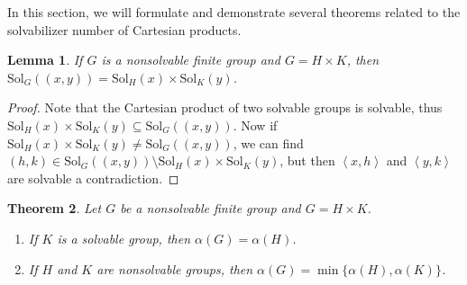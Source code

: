 \documentclass{amsart}
\newcommand{\Solv}{\text{Sol}}
\newtheorem{theorem}{Theorem}[section]
\newtheorem{lemma}[theorem]{Lemma}
\theoremstyle{definition}
\theoremstyle{remark}
\begin{document}
In this section, we will formulate and demonstrate several theorems related to the solvabilizer number of Cartesian products.
\newcommand\PSL[2]{\operatorname{PSL}_{#1}\left(#2\right)}
\newcommand\GL[2]{\operatorname{GL}_{#1}\left(#2\right)}
\newcommand\GammaL[2]{\operatorname{\Gamma{}L}_{#1}\left(#2\right)}
\newcommand\GF[1]{\mathbb{F}_{#1}}
\begin{lemma}
    If $G$ is a nonsolvable finite group and $G=H\times K$, then $\Solv_G((x,y))=\Solv_H(x)\times \Solv_K(y)$.
\end{lemma}
\begin{proof}
    Note that the Cartesian product of two solvable groups is solvable, thus $\Solv_H(x)\times \Solv_K(y)\subseteq\Solv_G((x,y))$. Now if $\Solv_H(x)\times \Solv_K(y)\neq\Solv_G((x,y))$, we can find $(h,k)\in \Solv_G((x,y))\setminus\Solv_H(x)\times \Solv_K(y) $, but then $\left\langle x, h\right\rangle$ and $\left\langle y, k\right\rangle$ are solvable a contradiction.
\end{proof}
\begin{theorem}\label{Car}
    Let $G$ be a nonsolvable finite group and $G=H\times K$.
    \begin{enumerate}
        \item If $K$ is a solvable group, then $\alpha(G)=\alpha(H)$.
         \item If $H$ and $K$ are nonsolvable groups, then $\alpha(G)=\min\{\alpha(H),\alpha(K)\}$.
         
    \end{enumerate}
    
\end{theorem}
\end{document}
